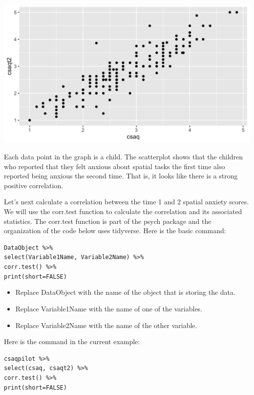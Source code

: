 \documentclass[
]{book}
\providecommand{\tightlist}{%
  \setlength{\itemsep}{0pt}\setlength{\parskip}{0pt}}
\begin{document}
\includegraphics{img/4R.5.png}

Each data point in the graph is a child. The scatterplot shows that the children who reported that they felt anxious about spatial tasks the first time also reported being anxious the second time. That is, it looks like there is a strong positive correlation.

Let's next calculate a correlation between the time 1 and 2 spatial anxiety scores. We will use the corr.test function to calculate the correlation and its associated statistics. The corr.test function is part of the psych package and the organization of the code below uses tidyverse. Here is the basic command:

\texttt{DataObject\ \%\textgreater{}\%}\\
\texttt{select(Variable1Name,\ Variable2Name)\ \%\textgreater{}\%}~\\
\texttt{corr.test()\ \%\textgreater{}\%}~\\
\texttt{print(short=FALSE)}

\begin{itemize}
\tightlist
\item
  Replace DataObject with the name of the object that is storing the data.\\
\item
  Replace Variable1Name with the name of one of the variables.\\
\item
  Replace Variable2Name with the name of the other variable.
\end{itemize}

Here is the command in the current example:

\texttt{csaqpilot\ \%\textgreater{}\%}\\
\texttt{select(csaq,\ csaqt2)\ \%\textgreater{}\%}~\\
\texttt{corr.test()\ \%\textgreater{}\%}~\\
\texttt{print(short=FALSE)}
\end{document}
